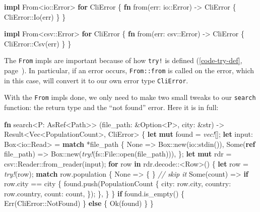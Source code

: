 \documentclass[a4paper,]{book}
\renewcommand*{\hyperref}[2][\ar]{%
  \def\ar{#2}%
  #2 (\autoref{#1}, page~\pageref{#1})}
\newenvironment{Shaded}{\begin{snugshade}}{\end{snugshade}}
\newcommand{\KeywordTok}[1]{\textcolor[rgb]{0.13,0.29,0.53}{\textbf{{#1}}}}
\newcommand{\DataTypeTok}[1]{\textcolor[rgb]{0.13,0.29,0.53}{{#1}}}
\newcommand{\ConstantTok}[1]{\textcolor[rgb]{0.00,0.00,0.00}{{#1}}}
\newcommand{\CommentTok}[1]{\textcolor[rgb]{0.56,0.35,0.01}{\textit{{#1}}}}
\newcommand{\PreprocessorTok}[1]{\textcolor[rgb]{0.56,0.35,0.01}{\textit{{#1}}}}
\newcommand{\NormalTok}[1]{{#1}}
\begin{document}
\begin{Shaded}
\begin{Highlighting}[]
\KeywordTok{impl} \NormalTok{From<io::Error> }\KeywordTok{for} \NormalTok{CliError \{}
    \KeywordTok{fn} \NormalTok{from(err: io::Error) -> CliError \{}
        \NormalTok{CliError::Io(err)}
    \NormalTok{\}}
\NormalTok{\}}

\KeywordTok{impl} \NormalTok{From<csv::Error> }\KeywordTok{for} \NormalTok{CliError \{}
    \KeywordTok{fn} \NormalTok{from(err: csv::Error) -> CliError \{}
        \NormalTok{CliError::Csv(err)}
    \NormalTok{\}}
\NormalTok{\}}
\end{Highlighting}
\end{Shaded}

The \texttt{From} impls are important because of how
\hyperref[code-try-def]{\texttt{try!} is defined}. In particular, if an
error occurs, \texttt{From::from} is called on the error, which in this
case, will convert it to our own error type \texttt{CliError}.

With the \texttt{From} impls done, we only need to make two small tweaks
to our \texttt{search} function: the return type and the ``not found''
error. Here it is in full:

\begin{Shaded}
\begin{Highlighting}[]
\KeywordTok{fn} \NormalTok{search<P: AsRef<Path>>}
         \NormalTok{(file_path: &}\DataTypeTok{Option}\NormalTok{<P>, city: &}\DataTypeTok{str}\NormalTok{)}
         \NormalTok{-> }\DataTypeTok{Result}\NormalTok{<}\DataTypeTok{Vec}\NormalTok{<PopulationCount>, CliError> \{}
    \KeywordTok{let} \KeywordTok{mut} \NormalTok{found = }\PreprocessorTok{vec!}\NormalTok{[];}
    \KeywordTok{let} \NormalTok{input: }\DataTypeTok{Box}\NormalTok{<io::Read> = }\KeywordTok{match} \NormalTok{*file_path \{}
        \ConstantTok{None} \NormalTok{=> }\DataTypeTok{Box}\NormalTok{::new(io::stdin()),}
        \ConstantTok{Some}\NormalTok{(}\KeywordTok{ref} \NormalTok{file_path) => }\DataTypeTok{Box}\NormalTok{::new(}\PreprocessorTok{try!}\NormalTok{(fs::File::open(file_path))),}
    \NormalTok{\};}
    \KeywordTok{let} \KeywordTok{mut} \NormalTok{rdr = csv::Reader::from_reader(input);}
    \KeywordTok{for} \NormalTok{row }\KeywordTok{in} \NormalTok{rdr.decode::<Row>() \{}
        \KeywordTok{let} \NormalTok{row = }\PreprocessorTok{try!}\NormalTok{(row);}
        \KeywordTok{match} \NormalTok{row.population \{}
            \ConstantTok{None} \NormalTok{=> \{ \} }\CommentTok{// skip it}
            \ConstantTok{Some}\NormalTok{(count) => }\KeywordTok{if} \NormalTok{row.city == city \{}
                \NormalTok{found.push(PopulationCount \{}
                    \NormalTok{city: row.city,}
                    \NormalTok{country: row.country,}
                    \NormalTok{count: count,}
                \NormalTok{\});}
            \NormalTok{\},}
        \NormalTok{\}}
    \NormalTok{\}}
    \KeywordTok{if} \NormalTok{found.is_empty() \{}
        \ConstantTok{Err}\NormalTok{(CliError::NotFound)}
    \NormalTok{\} }\KeywordTok{else} \NormalTok{\{}
        \ConstantTok{Ok}\NormalTok{(found)}
    \NormalTok{\}}
\NormalTok{\}}
\end{Highlighting}
\end{Shaded}
\end{document}
